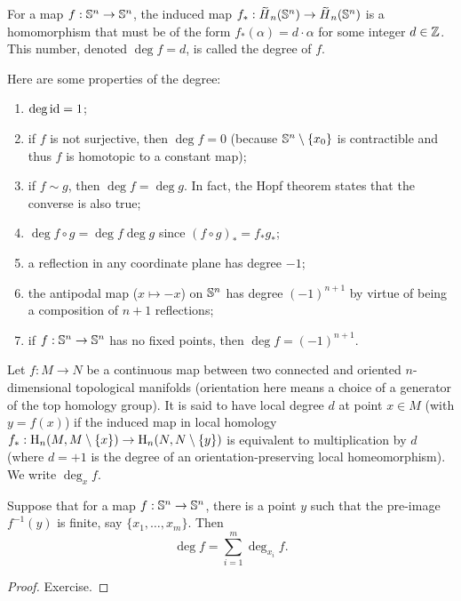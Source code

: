 \begin{defn}\label{Degree}
    For a map $f:\mathbb{S}^n\to \mathbb{S}^n$, the induced map $f_\ast:\wt{H}_n(\bbS^n)\to \wt{H}_n(\bbS^n)$ is a homomorphism that must be of the form $f_\ast(\alpha)=d\cdot \alpha$ for some integer $d\in\mathbb{Z}$. This number, denoted $\deg f=d$, is called the degree of $f$.
\end{defn}
Here are some properties of the degree:
\begin{enumerate}
    \item $\deg\operatorname{id}=1$;
    \item if $f$ is not surjective, then $\deg f=0$ (because $\mathbb{S}^n\setminus\{x_0\}$ is contractible and thus $f$ is homotopic to a constant map);
    \item if $f\sim g$, then $\deg f=\deg g$. In fact, the Hopf theorem states that the converse is also true;
    \item $\deg f\circ g=\deg f\deg g$ since $(f\circ g)_\ast=f_\ast g_\ast $;
    \item a reflection in any coordinate plane has degree $-1$;
    \item the antipodal map ($x\mapsto -x$) on $\mathbb{S}^n$ has degree $(-1)^{n+1}$ by virtue of being a composition of $n+1$ reflections;
    \item if $f:\mathbb{S}^n\to \mathbb{S}^n$ has no fixed points, then $\deg f=(-1)^{n+1}$.
\end{enumerate}


\begin{defn}
    Let $f:M\to N$ be a continuous map between two connected and oriented $n$-dimensional topological manifolds (orientation here means a choice of a generator of the top homology group). It is said to have local degree $d$ at point $x\in M$ (with $y=f(x)$) if the induced map in local homology $f_\ast:\mathrm{H}_n(M,M\setminus\{x\})\to \mathrm{H}_n(N,N\setminus\{y\})$ is equivalent to multiplication by $d$ (where $d=+1$ is the degree of an orientation-preserving local homeomorphism). We write $\deg_x f$.
\end{defn}

\begin{prop}\label{prop local degree formula}
    Suppose that for a map $f:\mathbb{S}^n\to \mathbb{S}^n$, there is a point $y$ such that the pre-image $f^{-1}(y)$ is finite, say $\{x_1,\ldots,x_m\}$. Then \[\deg f=\sum_{i=1}^m \deg_{x_i} f.\]
\end{prop}
\begin{proof}
     Exercise.
\end{proof}

